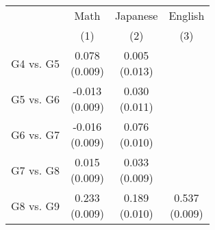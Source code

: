 \begin{tabular}{lccc}
\hline \hline 
 & Math & Japanese & English \\
 & (1) & (2) & (3) \\
\hline \hline 
G4 vs. G5 & \makecell[tc]{0.078\\(0.009)} & \makecell[tc]{0.005\\(0.013)} &  \\
G5 vs. G6 & \makecell[tc]{-0.013\\(0.009)} & \makecell[tc]{0.030\\(0.011)} &  \\
G6 vs. G7 & \makecell[tc]{-0.016\\(0.009)} & \makecell[tc]{0.076\\(0.010)} &  \\
G7 vs. G8 & \makecell[tc]{0.015\\(0.009)} & \makecell[tc]{0.033\\(0.009)} &  \\
G8 vs. G9 & \makecell[tc]{0.233\\(0.009)} & \makecell[tc]{0.189\\(0.010)} & \makecell[tc]{0.537\\(0.009)} \\
\hline \hline 
\end{tabular}